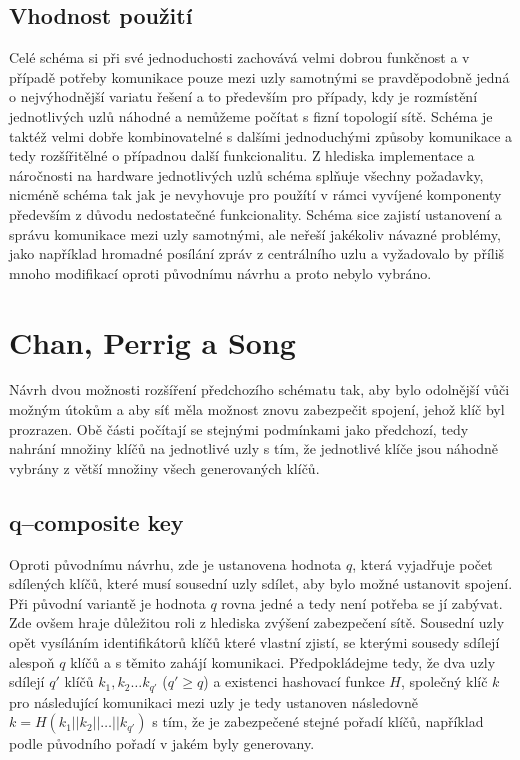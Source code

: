 \documentclass[11pt,final,twoside]{fithesis2}
\begin{document}
\subsection{Vhodnost použití}
Celé schéma si při své jednoduchosti zachovává velmi dobrou funkčnost a v případě potřeby komunikace pouze mezi uzly samotnými se pravděpodobně jedná o nejvýhodnější
variatu řešení a to především pro případy, kdy je rozmístění jednotlivých uzlů náhodné a nemůžeme počítat s fizní topologií sítě. Schéma je taktéž velmi dobře kombinovatelné
s dalšími jednoduchými způsoby komunikace a tedy rozšířitělné o případnou další funkcionalitu. Z hlediska implementace a náročnosti na hardware jednotlivých uzlů schéma
splňuje všechny požadavky, nicméně schéma tak jak je nevyhovuje pro použítí v rámci vyvíjené komponenty především z důvodu nedostatečné funkcionality. Schéma sice zajistí ustanovení
a správu komunikace mezi uzly samotnými, ale neřeší jakékoliv návazné problémy, jako například hromadné posílání zpráv z centrálního uzlu a vyžadovalo by příliš mnoho modifikací oproti 
původnímu návrhu a proto nebylo vybráno.

\section{Chan, Perrig a Song}
Návrh dvou možnosti rozšíření\cite{Perrig2003} předchozího schématu\cite{Eschenauer2002} tak, aby bylo odolnější vůči možným útokům a aby síť měla možnost znovu zabezpečit spojení, jehož
klíč byl prozrazen. Obě části počítají se stejnými podmínkami jako předchozí, tedy nahrání množiny klíčů na jednotlivé uzly s tím, že jednotlivé klíče jsou náhodně vybrány 
z větší množiny všech generovaných klíčů.

\subsection{q--composite key}
Oproti původnímu návrhu, zde je ustanovena hodnota $q$, která vyjadřuje počet sdílených klíčů, které musí sousední uzly sdílet, aby bylo možné ustanovit spojení. Při původní variantě 
je hodnota $q$ rovna jedné a tedy není potřeba se jí zabývat. Zde ovšem hraje důležitou roli z hlediska zvýšení zabezpečení sítě. Sousední uzly opět vysíláním identifikátorů klíčů které vlastní
zjistí, se kterými sousedy sdílejí alespoň $q$ klíčů a s těmito zahájí komunikaci. Předpokládejme tedy, že dva uzly sdílejí $q'$ klíčů $k_1, k_2 \dots k_{q'}$ ($q' \ge q$) a existenci hashovací funkce $H$, 
společný klíč $k$ pro následující komunikaci mezi uzly je tedy ustanoven následovně $k=H(k_1 || k_2 || \dots || k_{q'})$ s tím, že je zabezpečené stejné pořadí klíčů, například podle původního
pořadí v jakém byly generovany. 
\end{document}
